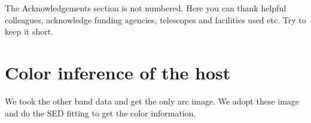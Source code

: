 \documentclass[fleqn,usenatbib]{mnras}
\begin{document}
The Acknowledgements section is not numbered. Here you can thank helpful
colleagues, acknowledge funding agencies, telescopes and facilities used etc.
Try to keep it short.










\appendix

\section{Color inference of the host}
We took the other band data and get the only arc image. We adopt these image and do the SED fitting to get the color information.



\bsp	%
\label{lastpage}
\end{document}
